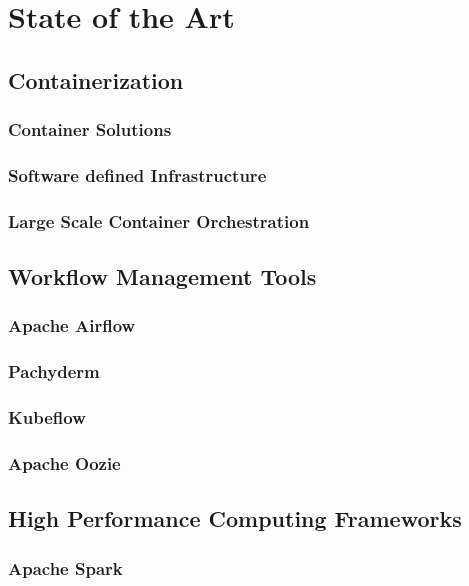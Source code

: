 \chapter{State of the Art}
\label{State_of_the_Art}

\section{Containerization}
    \blindtext[1]

    \subsection*{Container Solutions}
    \subsection*{Software defined Infrastructure}
    \subsection*{Large Scale Container Orchestration}
    \newpage


\section{Workflow Management Tools}
    \blindtext[1]

    \subsection*{Apache Airflow}
    \subsection*{Pachyderm}
    \subsection*{Kubeflow}
    \subsection*{Apache Oozie}
    \newpage


\section{High Performance Computing Frameworks}
    \blindtext[1]

     \subsection*{Apache Spark}
